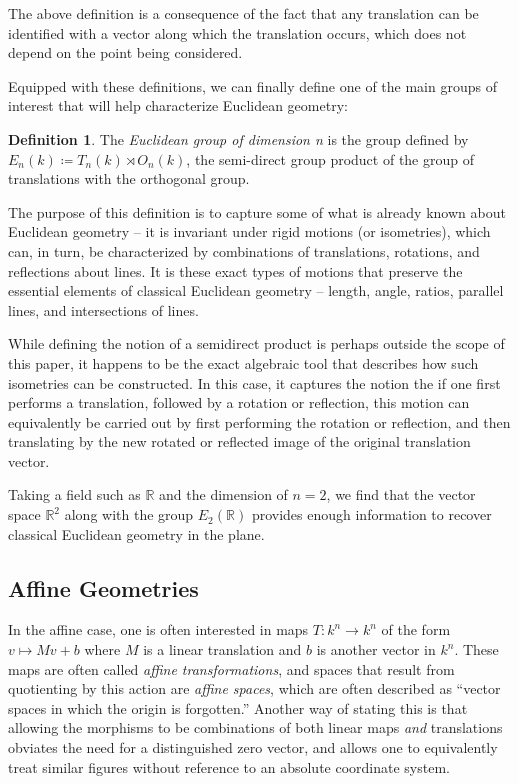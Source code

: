 \documentclass{article}
\theoremstyle{definition}
\newtheorem{definition}[theorem]{Definition} %
\newcommand{\RR}{\mathbb{R}}
\newcommand{\definedas}[0]{\coloneqq}
\begin{document}
The above definition is a consequence of the fact that any translation
can be identified with a vector along which the translation occurs,
which does not depend on the point being considered.

Equipped with these definitions, we can finally define one of the main
groups of interest that will help characterize Euclidean geometry:

\begin{definition} The \emph{Euclidean group of dimension n} is the group
defined by \(E_n(k) \definedas T_n(k) \rtimes O_n(k)\), the semi-direct
group product of the group of translations with the orthogonal group.
\end{definition}

The purpose of this definition is to capture some of what is already known about
Euclidean geometry -- it is invariant under rigid motions (or
isometries), which can, in turn, be characterized by combinations of
translations, rotations, and reflections about lines. It is
these exact types of motions that preserve the essential elements of
classical Euclidean geometry -- length, angle, ratios, parallel lines,
and intersections of lines.

While defining the notion of a semidirect product is perhaps outside the
scope of this paper, it happens to be the exact algebraic tool that
describes how such isometries can be constructed. In this case, it
captures the notion the if one first performs a translation, followed by
a rotation or reflection, this motion can equivalently be carried out by
first performing the rotation or reflection, and then translating by the
new rotated or reflected image of the original translation vector.

Taking a field such as \(\RR\) and the dimension of \(n=2\), we find
that the vector space \(\RR^2\) along with the group \(E_2(\RR)\)
provides enough information to recover classical Euclidean geometry in the plane.

\subsection{Affine Geometries}\label{header-n86}

In the affine case, one is often interested in maps
\(T: k^n \rightarrow k^n\) of the form \(v \mapsto Mv + b\) where \(M\)
is a linear translation and \(b\) is another vector in \(k^n\). These
maps are often called \emph{affine transformations}, and spaces that result from quotienting by this action are \textit{affine spaces}, which are often described as ``vector spaces in which the origin is
forgotten.'' Another way of stating this is that allowing the morphisms
to be combinations of both linear maps \emph{and} translations obviates the need for a
distinguished zero vector, and allows one to equivalently treat similar
figures without reference to an absolute coordinate system.
\end{document}
